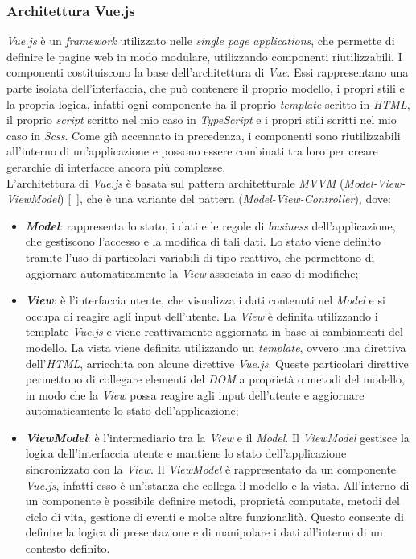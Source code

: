 \subsubsection{Architettura Vue.js}\label{subsubsec:architettura-vue.js}
\textit{Vue.js} è un \textit{framework} utilizzato nelle \textit{single page applications}, che permette di definire le pagine web in modo modulare, utilizzando componenti riutilizzabili.
I componenti costituiscono la base dell'architettura di \textit{Vue}. Essi rappresentano una parte isolata dell'interfaccia, che può contenere il proprio modello, i propri stili e la propria logica, infatti ogni componente ha il proprio
\textit{template} scritto in \textit{HTML}, il proprio \textit{script} scritto nel mio caso in \textit{TypeScript} e i propri stili scritti nel mio caso in \textit{Scss}.
Come già accennato in precedenza, i componenti sono riutilizzabili all'interno di un'applicazione e possono essere combinati tra loro per creare gerarchie di interfacce ancora più complesse.\\

L'architettura di \textit{Vue.js} è basata sul pattern architetturale \textit{MVVM} (\textit{Model-View-ViewModel}) [~\cite{site:vue-architettura}], che è una variante del pattern  (\textit{Model-View-Controller}), dove:
\begin{itemize}
  \item \textbf{\textit{Model}}: rappresenta lo stato, i dati e le regole di \textit{business} dell'applicazione, che gestiscono l'accesso e la modifica di tali dati. Lo stato viene definito tramite l'uso
  di particolari variabili di tipo reattivo, che permettono di aggiornare automaticamente la \textit{View} associata in caso di modifiche;
  \item \textbf{\textit{View}}: è l'interfaccia utente, che visualizza i dati contenuti nel \textit{Model} e si occupa di reagire agli input dell'utente. La \textit{View} è definita utilizzando i template \textit{Vue.js} e viene reattivamente aggiornata in base ai cambiamenti del modello. La vista viene definita utilizzando un \textit{template}, ovvero una direttiva dell'\textit{HTML}, arricchita con alcune direttive \textit{Vue.js}. 
  Queste particolari direttive permettono di collegare elementi del \textit{DOM} a proprietà o metodi del modello, in modo che la \textit{View} possa reagire agli input dell'utente e aggiornare automaticamente lo stato dell'applicazione;
  \item \textbf{\textit{ViewModel}}: è l'intermediario tra la \textit{View} e il \textit{Model}. Il \textit{ViewModel} gestisce la logica dell'interfaccia utente e mantiene lo stato dell'applicazione sincronizzato con la \textit{View}.
  Il \textit{ViewModel} è rappresentato da un componente \textit{Vue.js}, infatti esso è un'istanza che collega il modello e la vista. All'interno di un componente è possibile definire metodi, proprietà 
  computate, metodi del ciclo di vita, gestione di eventi e molte altre funzionalità. Questo consente di definire la logica di presentazione e di manipolare i dati all'interno di un contesto definito.
\end{itemize}

